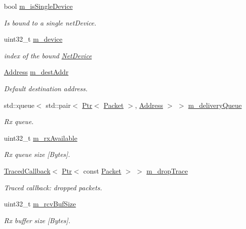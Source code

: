 \begin{DoxyCompactItemize}
bool \hyperlink{classns3_1_1PacketSocket_a8d45062d8bdc229074cfc45e4abb77ec}{m\+\_\+is\+Single\+Device}
\begin{DoxyCompactList}\small\item\em Is bound to a single net\+Device. \end{DoxyCompactList}\item 
uint32\+\_\+t \hyperlink{classns3_1_1PacketSocket_ad55c1b060ff4bce8e74e874c83cf88d3}{m\+\_\+device}
\begin{DoxyCompactList}\small\item\em index of the bound \hyperlink{classns3_1_1NetDevice}{Net\+Device} \end{DoxyCompactList}\item 
\hyperlink{classns3_1_1Address}{Address} \hyperlink{classns3_1_1PacketSocket_a22323e0871995f6f217d647301923ceb}{m\+\_\+dest\+Addr}
\begin{DoxyCompactList}\small\item\em Default destination address. \end{DoxyCompactList}\item 
std\+::queue$<$ std\+::pair$<$ \hyperlink{classns3_1_1Ptr}{Ptr}$<$ \hyperlink{classns3_1_1Packet}{Packet} $>$, \hyperlink{classns3_1_1Address}{Address} $>$ $>$ \hyperlink{classns3_1_1PacketSocket_a436086ef3cbe575138ad46c14e58aa56}{m\+\_\+delivery\+Queue}
\begin{DoxyCompactList}\small\item\em Rx queue. \end{DoxyCompactList}\item 
uint32\+\_\+t \hyperlink{classns3_1_1PacketSocket_a3afd17f0f1692c887648d0c2cb6d406c}{m\+\_\+rx\+Available}
\begin{DoxyCompactList}\small\item\em Rx queue size \mbox{[}Bytes\mbox{]}. \end{DoxyCompactList}\item 
\hyperlink{classns3_1_1TracedCallback}{Traced\+Callback}$<$ \hyperlink{classns3_1_1Ptr}{Ptr}$<$ const \hyperlink{classns3_1_1Packet}{Packet} $>$ $>$ \hyperlink{classns3_1_1PacketSocket_ae962e642085d93dadd3832a0355a10ad}{m\+\_\+drop\+Trace}
\begin{DoxyCompactList}\small\item\em Traced callback\+: dropped packets. \end{DoxyCompactList}\item 
uint32\+\_\+t \hyperlink{classns3_1_1PacketSocket_a77f51ae1c17685fee11e5e10d90bd2f4}{m\+\_\+rcv\+Buf\+Size}
\begin{DoxyCompactList}\small\item\em Rx buffer size \mbox{[}Bytes\mbox{]}. \end{DoxyCompactList}\end{DoxyCompactItemize}
